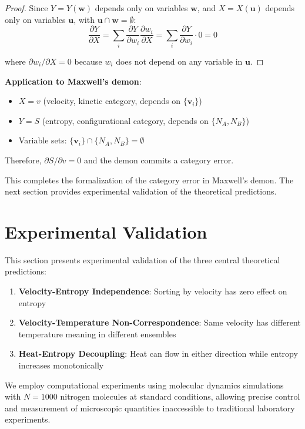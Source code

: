 \documentclass[10pt,twocolumn,letterpaper]{article}
\theoremstyle{definition}
\theoremstyle{remark}
\newcommand{\pderiv}[2]{\frac{\partial #1}{\partial #2}}
\begin{document}
\begin{proof}
Since $Y = Y(\mathbf{w})$ depends only on variables $\mathbf{w}$, and $X = X(\mathbf{u})$ depends only on variables $\mathbf{u}$, with $\mathbf{u} \cap \mathbf{w} = \emptyset$:
\begin{equation}
\pderiv{Y}{X} = \sum_{i} \pderiv{Y}{w_i} \pderiv{w_i}{X} = \sum_{i} \pderiv{Y}{w_i} \cdot 0 = 0
\end{equation}

where $\partial w_i/\partial X = 0$ because $w_i$ does not depend on any variable in $\mathbf{u}$.
\end{proof}

\textbf{Application to Maxwell's demon}:
\begin{itemize}
\item $X = v$ (velocity, kinetic category, depends on $\{\mathbf{v}_i\}$)
\item $Y = S$ (entropy, configurational category, depends on $\{N_A, N_B\}$)
\item Variable sets: $\{\mathbf{v}_i\} \cap \{N_A, N_B\} = \emptyset$
\end{itemize}

Therefore, $\partial S/\partial v = 0$ and the demon commits a category error.

This completes the formalization of the category error in Maxwell's demon. The next section provides experimental validation of the theoretical predictions.


\section{Experimental Validation}
\label{sec:experimental}

This section presents experimental validation of the three central theoretical predictions:
\begin{enumerate}
\item \textbf{Velocity-Entropy Independence}: Sorting by velocity has zero effect on entropy
\item \textbf{Velocity-Temperature Non-Correspondence}: Same velocity has different temperature meaning in different ensembles
\item \textbf{Heat-Entropy Decoupling}: Heat can flow in either direction while entropy increases monotonically
\end{enumerate}

We employ computational experiments using molecular dynamics simulations with $N = 1000$ nitrogen molecules at standard conditions, allowing precise control and measurement of microscopic quantities inaccessible to traditional laboratory experiments.
\end{document}
